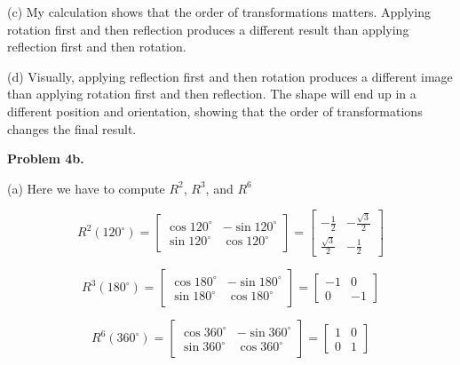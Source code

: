 \documentclass{ximera}
\begin{document}
\begin{problem}
\vspace{0.3cm}

(c) My calculation shows that the order of transformations matters. Applying rotation first and then reflection produces a different result than applying reflection first and then rotation.

\vspace{0.3cm}

(d) Visually, applying reflection first and then rotation produces a different image than applying rotation first and then reflection. The shape will end up in a different position and orientation, showing that the order of transformations changes the final result.

  \vspace{0.7cm}

\textbf{Problem 4b.}\\

  \vspace{0.01cm}
  
(a) Here we have to compute $R^2$, $R^3$, and $R^6$\\

    \vspace{0.03cm}
    
   $$ R^2(120^\circ) =
\begin{bmatrix}
\cos 120^\circ & -\sin 120^\circ \\
\sin 120^\circ & \cos 120^\circ
\end{bmatrix}
=
\begin{bmatrix}
-\frac{1}{2} & -\frac{\sqrt{3}}{2} \\
\frac{\sqrt{3}}{2} & -\frac{1}{2}
\end{bmatrix} $$

  \vspace{0.2cm}

$$ R^3(180^\circ) =
\begin{bmatrix}
\cos 180^\circ & -\sin 180^\circ \\
\sin 180^\circ & \cos 180^\circ
\end{bmatrix}
=
\begin{bmatrix}
-1 & 0 \\
0 & -1
\end{bmatrix}$$

  \vspace{0.2cm}

 $$ R^6(360^\circ) =
\begin{bmatrix}
\cos 360^\circ & -\sin 360^\circ \\
\sin 360^\circ & \cos 360^\circ
\end{bmatrix}
=
\begin{bmatrix}
1 & 0 \\
0 & 1
\end{bmatrix}$$


\end{problem}
\end{document}
